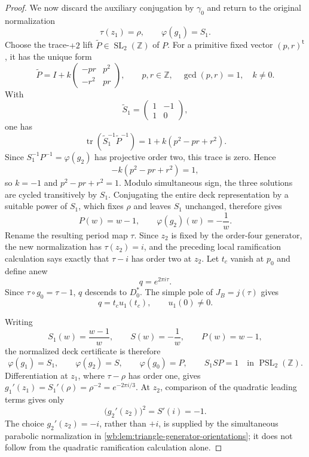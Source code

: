 \begin{proof}
We now discard the auxiliary conjugation by \(\gamma_0\) and return to the
original normalization
\[
 \tau(z_1)=\rho,\qquad \varphi(g_1)=S_1.
\]
Choose the trace-\(+2\) lift
\(\widetilde P\in\operatorname{SL}_2(\mathbb Z)\) of \(P\).  For a
primitive fixed vector \((p,r)^{\mathsf t}\), it has the unique form
\[
 \widetilde P
 =I+k\begin{pmatrix}-pr&p^2\\-r^2&pr\end{pmatrix},
 \qquad p,r\in\mathbb Z,\quad \gcd(p,r)=1,\quad k\ne0.
\]
With
\[
 \widetilde S_1=\begin{pmatrix}1&-1\\1&0\end{pmatrix},
\]
one has
\[
 \operatorname{tr}(\widetilde S_1^{-1}\widetilde P^{-1})
 =1+k(p^2-pr+r^2).
\]
Since \(S_1^{-1}P^{-1}=\varphi(g_2)\) has projective order two, this trace
is zero.  Hence
\[
 -k(p^2-pr+r^2)=1,
\]
so \(k=-1\) and \(p^2-pr+r^2=1\).  Modulo simultaneous sign, the three
solutions are cycled transitively by \(S_1\).  Conjugating the entire deck
representation by a suitable power of \(S_1\), which fixes \(\rho\) and
leaves \(S_1\) unchanged, therefore gives
\[
 P(w)=w-1,\qquad \varphi(g_2)(w)=-\frac1w.
\]
Rename the resulting period map \(\tau\).  Since \(z_2\) is fixed by the
order-four generator, the new normalization has \(\tau(z_2)=i\), and the
preceding local ramification calculation says exactly that \(\tau-i\) has
order two at \(z_2\).  Let \(t_c\) vanish at \(p_0\) and define anew
\[
 q=e^{2\pi i\tau}.
\]
Since \(\tau\circ g_0=\tau-1\), \(q\) descends to \(D_0^*\).  The simple
pole of \(J_B=j(\tau)\) gives
\[
 q=t_cu_1(t_c),\qquad u_1(0)\ne0.
\]

Writing
\[
 S_1(w)=\frac{w-1}{w},\qquad S(w)=-\frac1w,
 \qquad P(w)=w-1,
\]
the normalized deck certificate is therefore
\begin{equation}
 \varphi(g_1)=S_1,\qquad
 \varphi(g_2)=S,\qquad
 \varphi(g_0)=P,\qquad
 S_1SP=1
 \quad\text{in }\operatorname{PSL}_2(\mathbb Z).
\label{wb:eq:period-deck-certificate}
\end{equation}
Differentiation at \(z_1\), where \(\tau-\rho\) has order one, gives
\(g_1'(z_1)=S_1'(\rho)=\rho^{-2}=e^{-2\pi i/3}\).  At \(z_2\), comparison
of the quadratic leading terms gives only
\[
 \bigl(g_2'(z_2)\bigr)^2=S'(i)=-1.
\]
The choice \(g_2'(z_2)=-i\), rather than \(+i\), is supplied by the
simultaneous parabolic normalization in
\cref{wb:lem:triangle-generator-orientations}; it does not follow from the
quadratic ramification calculation alone.


\end{proof}
